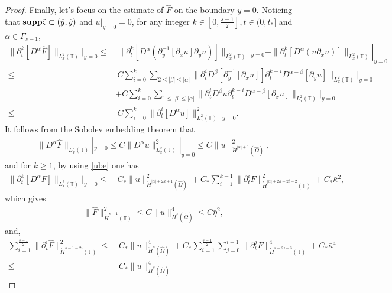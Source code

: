 \documentclass{amsart}
\numberwithin{equation}{section}
\begin{document}
\begin{proof}
Finally, let's focus on the estimate of $\hat{F}$ on the boundary $y=0$.
Noticing that ${\bf supp}\tilde{\varsigma}\subset(\check{y},\hat{y})$ and $u|_{y=0}=0$, for any integer $k\in[0,\frac{s-1}{2}], t\in(0,t_{*}]$ and $\alpha\in\Gamma_{s-1}$,
\begin{align*}
\|\partial_{t}^{k}[D^{\alpha}\hat{F}]\|_{L_{x}^{2}(\mathbb{T})}|_{y=0}
\leq&~\|\partial_{t}^{k}[D^{\alpha}(\partial_{y}^{-1}[\partial_{x}u]\partial_{y}u)]\|_{L_{x}^{2}(\mathbb{T})}|_{y=0}
     +\|\partial_{t}^{k}[D^{\alpha}(u\partial_{x}u)]\|_{L_{x}^{2}(\mathbb{T})}|_{y=0}\\
\leq&~C\sum_{i=0}^{k}\sum_{2\leq|\beta|\leq|\alpha|}\|\partial_{t}^{i}D^{\beta}[\partial_{y}^{-1}[\partial_{x}u]]\partial_{t}^{k-i}D^{\alpha-\beta}[\partial_{y}u]\|_{L_{x}^{2}(\mathbb{T})}|_{y=0}\\
    &+C\sum_{i=0}^{k}\sum_{1\leq|\beta|\leq|\alpha|}\|\partial_{t}^{i}D^{\beta}u\partial_{t}^{k-i}D^{\alpha-\beta}[\partial_{x}u]\|_{L_{x}^{2}(\mathbb{T})}|_{y=0}\\
\leq&~C\sum_{i=0}^{k}\|\partial_{t}^{i}[D^{\alpha}u]\|_{L_{x}^{2}(\mathbb{T})}^{2}|_{y=0}.
\end{align*}
It follows from the Sobolev embedding theorem that
\begin{align*}
\|D^{\alpha}\hat{F}\|_{L_{x}^{2}(\mathbb{T})}|_{y=0}
\leq C\|D^{\alpha}u\|_{L_{x}^{2}(\mathbb{T})}^{2}|_{y=0}
\leq C\|u\|_{\ddot{H}^{|\alpha|+1}(\hat{\Omega})}^{2},
\end{align*}
and for $k\geq1$, by using \eqref{ube} one has
\begin{align*}
\|\partial_{t}^{k}[D^{\alpha}F]\|_{L_{x}^{2}(\mathbb{T})}|_{y=0}
\leq&~C_{*}\|u\|_{\ddot{H}^{|\alpha|+2k+1}(\hat{\Omega})}^{2}
     +C_{*}\sum_{i=1}^{k-1}\|\partial_{t}^{i}F\|_{\mathring{H}^{|\alpha|+2k-2i-2}(\mathbb{T})}^{2}
     +C_{*}\bar{\kappa}^{2},
\end{align*}
which gives
\begin{align*}
\|\hat{F}\|_{\mathring{H}^{s-1}(\mathbb{T})}^{2}\leq C\|u\|_{\ddot{H}^{s}(\hat{\Omega})}^{4}\leq C\bar{\eta}^{2},
\end{align*}
and,
\begin{align*}
\sum_{i=1}^{\frac{s-1}{2}}\|\partial_{t}^{i}\hat{F}\|_{\mathring{H}^{s-1-2i}(\mathbb{T})}^{2}
\leq&~C_{*}\|u\|_{\ddot{H}^{s}(\hat{\Omega})}^{4}
     +C_{*}\sum_{i=1}^{\frac{s-1}{2}}\sum_{j=0}^{i-1}\|\partial_{t}^{j}F\|_{\mathring{H}^{s-2j-3}(\mathbb{T})}^{4}
     +C_{*}\bar{\kappa}^{4}\\
\leq&~C_{*}\|u\|_{\ddot{H}^{s}(\hat{\Omega})}^{4}

\end{align*}
\end{proof}
\end{document}

